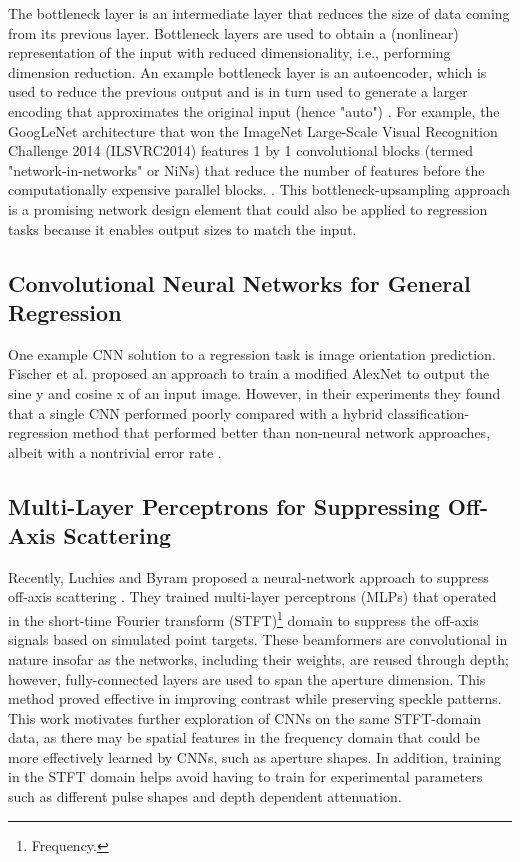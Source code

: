       The bottleneck layer is an intermediate layer that reduces the size of data coming from its previous layer. Bottleneck layers are used to obtain a (nonlinear) representation of the input with reduced dimensionality, i.e., performing dimension reduction. An example bottleneck layer is an autoencoder, which is used to reduce the previous output and is in turn used to generate a larger encoding that approximates the original input (hence "auto") \cite{ballard1987modular}. For example, the GoogLeNet architecture that won the ImageNet Large-Scale Visual Recognition Challenge 2014 (ILSVRC2014) features 1 by 1 convolutional blocks (termed "network-in-networks" or NiNs) that reduce the number of features before the computationally expensive parallel blocks. \cite{szegedy2015going}. This bottleneck-upsampling approach is a promising network design element that could also be applied to regression tasks because it enables output sizes to match the input.

    \subsection{Convolutional Neural Networks for General Regression}
      One example CNN solution to a regression task is image orientation prediction. Fischer et al. proposed an approach to train a modified AlexNet to output the sine y and cosine x of an input image. However, in their experiments they found that a single CNN performed poorly compared with a hybrid classification-regression method that performed better than non-neural network approaches, albeit with a nontrivial error rate \cite{fischer2015image}.

    \subsection{Multi-Layer Perceptrons for Suppressing Off-Axis Scattering}
      Recently, Luchies and Byram proposed a neural-network approach to suppress off-axis scattering \cite{luchies_tmi_2018, training_improvements}. They trained multi-layer perceptrons (MLPs) that operated in the short-time Fourier transform (STFT)\footnote{Frequency.} domain to suppress the off-axis signals based on simulated point targets. These beamformers are convolutional in nature insofar as the networks, including their weights, are reused through depth; however, fully-connected layers are used to span the aperture dimension. This method proved effective in improving contrast while preserving speckle patterns. This work motivates further exploration of CNNs on the same STFT-domain data, as there may be spatial features in the frequency domain that could be more effectively learned by CNNs, such as aperture shapes. In addition, training in the STFT domain helps avoid having to train for experimental parameters such as different pulse shapes and depth dependent attenuation. %

